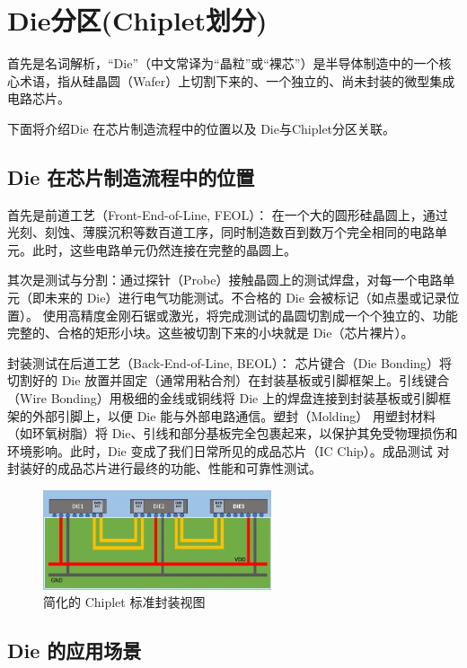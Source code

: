 \section{Die分区(Chiplet划分)}

首先是名词解析，“Die”（中文常译为“晶粒”或“裸芯”）是半导体制造中的一个核心术语，指从硅晶圆（Wafer）上切割下来的、一个独立的、尚未封装的微型集成电路芯片。

下面将介绍Die 在芯片制造流程中的位置以及 Die与Chiplet分区关联。

\subsection{Die 在芯片制造流程中的位置}

首先是前道工艺（Front-End-of-Line, FEOL）：
在一个大的圆形硅晶圆上，通过光刻、刻蚀、薄膜沉积等数百道工序，同时制造数百到数万个完全相同的电路单元。此时，这些电路单元仍然连接在完整的晶圆上。

其次是测试与分割：通过探针（Probe）接触晶圆上的测试焊盘，对每一个电路单元（即未来的 Die）进行电气功能测试。不合格的 Die 会被标记（如点墨或记录位置）。
使用高精度金刚石锯或激光，将完成测试的晶圆切割成一个个独立的、功能完整的、合格的矩形小块。这些被切割下来的小块就是 Die（芯片裸片）。

封装测试在后道工艺（Back-End-of-Line, BEOL）：
芯片键合（Die Bonding）将切割好的 Die 放置并固定（通常用粘合剂）在封装基板或引脚框架上。引线键合（Wire Bonding）用极细的金线或铜线将 Die 上的焊盘连接到封装基板或引脚框架的外部引脚上，以便 Die 能与外部电路通信。塑封（Molding）
用塑封材料（如环氧树脂）将 Die、引线和部分基板完全包裹起来，以保护其免受物理损伤和环境影响。此时，Die 变成了我们日常所见的成品芯片（IC Chip）。成品测试
对封装好的成品芯片进行最终的功能、性能和可靠性测试。

\begin{figure}[htbp]
	\centering
	\includegraphics[width=0.6\textwidth]{img/2-1.png} %
	\caption{简化的 Chiplet 标准封装视图 \cite{PiacentiniFilho2024Chiplet}}
	\label{fig:example}
\end{figure}

\subsection{Die 的应用场景}

